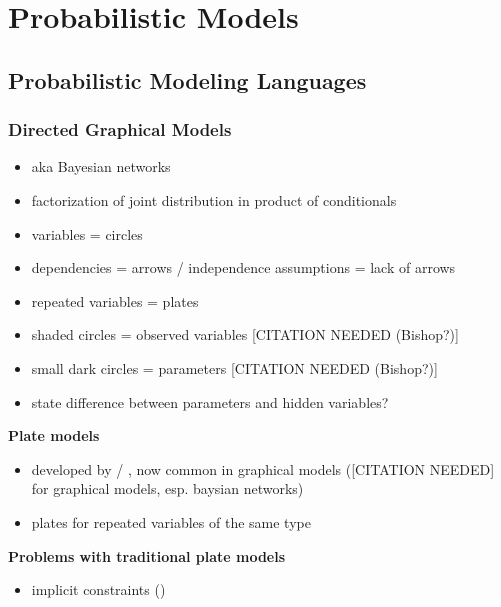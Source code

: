 \section{Probabilistic Models}

\subsection{Probabilistic Modeling Languages}

\subsubsection{Directed Graphical Models}

\begin{itemize}
\item aka Bayesian networks
\item factorization of joint distribution in product of conditionals
\item variables = circles
\item dependencies = arrows / independence assumptions = lack of arrows
\item repeated variables = plates
\item shaded circles = observed variables [CITATION NEEDED (Bishop?)]
\item small dark circles = parameters [CITATION NEEDED (Bishop?)]
\item state difference between parameters and hidden variables?
\end{itemize}

\textbf{Plate models}
\begin{itemize}
\item developed by \textcite{buntine1994operations} / \textcite{gilks1994language}, now common in graphical models ([CITATION NEEDED] for graphical models, esp. baysian networks)
\item plates for repeated variables of the same type
\end{itemize}

\textbf{Problems with traditional plate models}
\begin{itemize}
\item implicit constraints (\cite{heckerman2007probabilistic})
\end{itemize}

